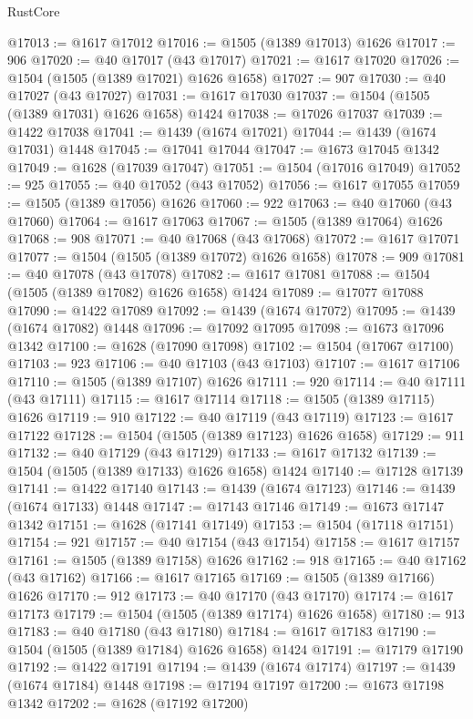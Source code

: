 \begin{lexlean}{RustCore}
\begin{coremodule}
@17013 := @1617 @17012
@17016 := @1505 (@1389 @17013) @1626
@17017 := 906
@17020 := @40 @17017 (@43 @17017)
@17021 := @1617 @17020
@17026 := @1504 (@1505 (@1389 @17021) @1626 @1658)
@17027 := 907
@17030 := @40 @17027 (@43 @17027)
@17031 := @1617 @17030
@17037 := @1504 (@1505 (@1389 @17031) @1626 @1658) @1424
@17038 := @17026 @17037
@17039 := @1422 @17038
@17041 := @1439 (@1674 @17021)
@17044 := @1439 (@1674 @17031) @1448
@17045 := @17041 @17044
@17047 := @1673 @17045 @1342
@17049 := @1628 (@17039 @17047)
@17051 := @1504 (@17016 @17049)
@17052 := 925
@17055 := @40 @17052 (@43 @17052)
@17056 := @1617 @17055
@17059 := @1505 (@1389 @17056) @1626
@17060 := 922
@17063 := @40 @17060 (@43 @17060)
@17064 := @1617 @17063
@17067 := @1505 (@1389 @17064) @1626
@17068 := 908
@17071 := @40 @17068 (@43 @17068)
@17072 := @1617 @17071
@17077 := @1504 (@1505 (@1389 @17072) @1626 @1658)
@17078 := 909
@17081 := @40 @17078 (@43 @17078)
@17082 := @1617 @17081
@17088 := @1504 (@1505 (@1389 @17082) @1626 @1658) @1424
@17089 := @17077 @17088
@17090 := @1422 @17089
@17092 := @1439 (@1674 @17072)
@17095 := @1439 (@1674 @17082) @1448
@17096 := @17092 @17095
@17098 := @1673 @17096 @1342
@17100 := @1628 (@17090 @17098)
@17102 := @1504 (@17067 @17100)
@17103 := 923
@17106 := @40 @17103 (@43 @17103)
@17107 := @1617 @17106
@17110 := @1505 (@1389 @17107) @1626
@17111 := 920
@17114 := @40 @17111 (@43 @17111)
@17115 := @1617 @17114
@17118 := @1505 (@1389 @17115) @1626
@17119 := 910
@17122 := @40 @17119 (@43 @17119)
@17123 := @1617 @17122
@17128 := @1504 (@1505 (@1389 @17123) @1626 @1658)
@17129 := 911
@17132 := @40 @17129 (@43 @17129)
@17133 := @1617 @17132
@17139 := @1504 (@1505 (@1389 @17133) @1626 @1658) @1424
@17140 := @17128 @17139
@17141 := @1422 @17140
@17143 := @1439 (@1674 @17123)
@17146 := @1439 (@1674 @17133) @1448
@17147 := @17143 @17146
@17149 := @1673 @17147 @1342
@17151 := @1628 (@17141 @17149)
@17153 := @1504 (@17118 @17151)
@17154 := 921
@17157 := @40 @17154 (@43 @17154)
@17158 := @1617 @17157
@17161 := @1505 (@1389 @17158) @1626
@17162 := 918
@17165 := @40 @17162 (@43 @17162)
@17166 := @1617 @17165
@17169 := @1505 (@1389 @17166) @1626
@17170 := 912
@17173 := @40 @17170 (@43 @17170)
@17174 := @1617 @17173
@17179 := @1504 (@1505 (@1389 @17174) @1626 @1658)
@17180 := 913
@17183 := @40 @17180 (@43 @17180)
@17184 := @1617 @17183
@17190 := @1504 (@1505 (@1389 @17184) @1626 @1658) @1424
@17191 := @17179 @17190
@17192 := @1422 @17191
@17194 := @1439 (@1674 @17174)
@17197 := @1439 (@1674 @17184) @1448
@17198 := @17194 @17197
@17200 := @1673 @17198 @1342
@17202 := @1628 (@17192 @17200)

\end{coremodule}
\end{lexlean}
